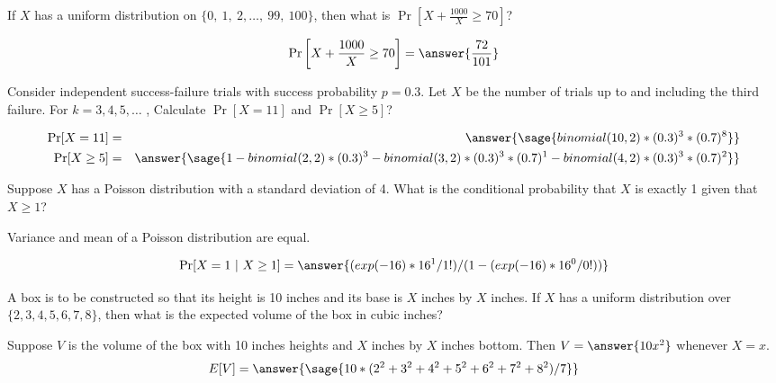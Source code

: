 \documentclass{ximera}
\begin{document}
\begin{problem}
If $X$ has a uniform distribution on $\{0,~1,~2,\ldots,~99,~100\}$, then what is $\Pr\left[X+\frac{1000}{X}\geq 70\right]$? 

\begin{prompt}
$$\Pr\left[X+\frac{1000}{X}\geq 70\right]=\answer{\frac{72}{101}}$$
\end{prompt}
\end{problem}


\begin{problem}
 Consider independent success-failure trials with success probability $p=0.3$. Let $X$ be the number of trials up to and including the third failure. For $k = 3, 4, 5, \ldots$ , Calculate $\Pr[X=11]$ and $\Pr[X\geq 5]$?

\begin{prompt}
\begin{eqnarray*}
\Pr[X=11]&=&\answer{\sage{binomial(10,2)*(0.3)^3*(0.7)^8}} \\
\Pr[X\geq 5]&=&\answer{\sage{1-binomial(2,2)*(0.3)^3-binomial(3,2)*(0.3)^3*(0.7)^1-binomial(4,2)*(0.3)^3*(0.7)^2}}
\end{eqnarray*}
\end{prompt}
\end{problem}


\begin{problem}
Suppose $X$ has a Poisson distribution with a standard deviation of 4. What is the conditional probability that $X$ is exactly 1 given that $X\geq1$? 

\begin{hint}
Variance and mean of a Poisson distribution are equal.
\end{hint}

\begin{prompt}
        $$\Pr[X=1~|~X\geq 1] =\answer{(exp(-16)*16^1/1!)/(1-(exp(-16)*16^0/0!))}$$
\end{prompt}
\end{problem}

\begin{problem}
A box is to be constructed so that its height is 10 inches and its base is $X$ inches by $X$ inches. If $X$ has a uniform distribution over $\{2,3,4,5,6,7,8\}$, then what is the expected volume of the box in cubic inches? 
\begin{prompt}
Suppose $V$ is the volume of the box with 10 inches heights and $X$ inches by $X$ inches bottom. Then $V=\answer{10x^2}$ whenever $X=x$.
$$E[V]=\answer{\sage{10*(2^2+3^2+4^2+5^2+6^2+7^2+8^2)/7}}
$$
\end{prompt}

\end{problem}
\end{document}
